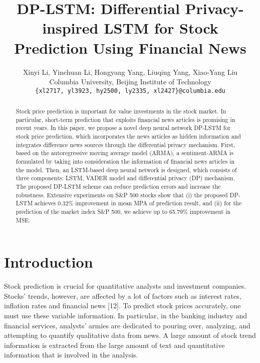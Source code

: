 \documentclass{article}
\title{DP-LSTM: Differential Privacy-inspired LSTM for Stock Prediction Using Financial News}
\author{Xinyi Li, Yinchuan Li, Hongyang Yang, Liuqing Yang, Xiao-Yang Liu \\
  Columbia University, Beijing Institute of Technology\\
  \texttt{\{xl2717, yl3923, hy2500, ly2335, xl2427\}@columbia.edu}
  }
\begin{document}
\maketitle

\begin{abstract}
Stock price prediction is important for value investments in the stock market. In particular, short-term prediction that exploits financial news articles is promising in recent years. In this paper, we propose a novel deep neural network DP-LSTM for stock price prediction, which incorporates the news articles as hidden information and integrates difference news sources through the differential privacy mechanism. First, based on the autoregressive moving average model (ARMA), a sentiment-ARMA is formulated by taking into consideration the information of financial news articles in the model. Then, an LSTM-based deep neural network is designed, which consists of three components: LSTM, VADER model and differential privacy (DP) mechanism. The proposed DP-LSTM scheme can reduce prediction errors and increase the robustness. Extensive experiments on S\&P 500 stocks show that (i) the proposed DP-LSTM achieves 0.32\% improvement in mean MPA of prediction result, and (ii) for the prediction of the market index S\&P 500, we achieve up to 65.79\% improvement in MSE.
\end{abstract}


\section{Introduction}


Stock prediction is crucial for quantitative analysts and investment companies. Stocks' trends, however, are affected by a lot of factors such as interest rates, inflation rates and financial news [12]. To predict stock prices accurately, one must use these variable information. In particular, in the banking industry and financial services, analysts' armies are dedicated to pouring over, analyzing, and attempting to quantify qualitative data from news. A large amount of stock trend information is extracted from the large amount of text and quantitative information that is involved in the analysis.
\end{document}
